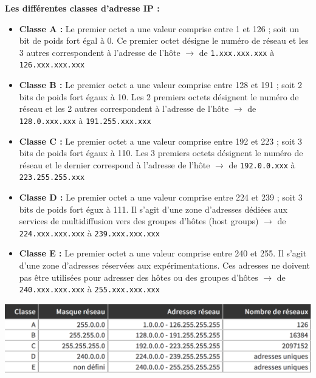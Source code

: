 \documentclass[a4paper,9pt, twocolumn]{article}
\begin{document}
	\textbf{Les différentes classes d'adresse IP :}
	\begin{itemize}
		\item \textbf{Classe A :} Le premier octet a une valeur comprise entre 1 et 126 ; soit un bit de poids fort égal à 0. Ce premier octet désigne le numéro de réseau et les 3 autres correspondent à l'adresse de l'hôte $\longrightarrow$ de \texttt{1.xxx.xxx.xxx} à \texttt{126.xxx.xxx.xxx}
		\item \textbf{Classe B :} Le premier octet a une valeur comprise entre 128 et 191 ; soit 2 bits de poids fort égaux à 10. Les 2 premiers octets désignent le numéro de réseau et les 2 autres correspondent à l'adresse de l'hôte $\longrightarrow$ de \texttt{128.0.xxx.xxx} à \texttt{191.255.xxx.xxx}
		\item \textbf{Classe C :} Le premier octet a une valeur comprise entre 192 et 223 ; soit 3 bits de poids fort égaux à 110. Les 3 premiers octets désignent le numéro de réseau et le dernier correspond à l'adresse de l'hôte $\longrightarrow$ de \texttt{192.0.0.xxx} à \texttt{223.255.255.xxx}
		\item \textbf{Classe D :} Le premier octet a une valeur comprise entre 224 et 239 ; soit 3 bits de poids fort égux à 111. Il s'agit d'une zone d'adresses dédiées aux services de multidiffusion vers des groupes d'hôtes (host groups) $\longrightarrow$ de \texttt{224.xxx.xxx.xxx} à \texttt{239.xxx.xxx.xxx}
		\item \textbf{Classe E : }Le premier octet a une valeur comprise entre 240 et 255. Il s'agit d'une zone d'adresses réservées aux expérimentations. Ces adresses ne doivent pas être utilisées pour adresser des hôtes ou des groupes d'hôtes $\longrightarrow$ de \texttt{240.xxx.xxx.xxx} à \texttt{255.xxx.xxx.xxx}
	\end{itemize}

	\includegraphics[scale=0.38]{masq.png}
	
\end{document}
